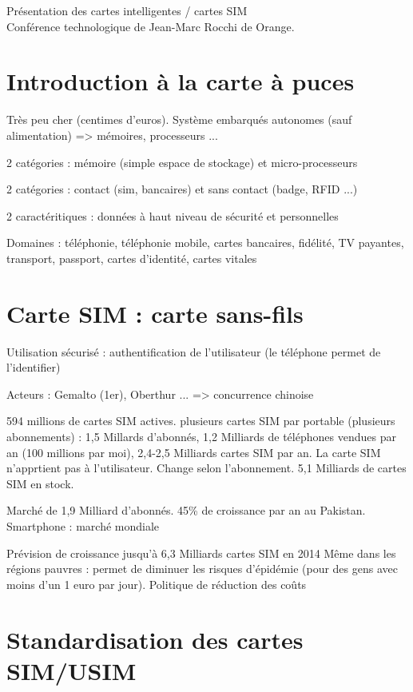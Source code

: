 \documentclass[a4paper,12pt]{article}
\begin{document}
\begin{center}
\Large{Présentation des cartes intelligentes / cartes SIM}\\
\vspace{0.4cm}
\normalsize{Conférence technologique de Jean-Marc Rocchi de Orange.}\\
\end{center}

\section{Introduction à la carte à puces}

Très peu cher (centimes d'euros).
Système embarqués autonomes (sauf alimentation) => mémoires, processeurs ...

2 catégories : mémoire (simple espace de stockage) et micro-processeurs

2 catégories : contact (sim, bancaires) et sans contact (badge, RFID ...)

2 caractéritiques : données à haut niveau de sécurité et personnelles

Domaines : téléphonie, téléphonie mobile, cartes bancaires, fidélité, TV payantes, transport, passport, cartes d'identité, cartes vitales

\section{Carte SIM : carte sans-fils}

Utilisation sécurisé : authentification de l'utilisateur (le téléphone permet de l'identifier)

Acteurs : Gemalto (1er), Oberthur ... => concurrence chinoise 

594 millions de cartes SIM actives. plusieurs cartes SIM par portable (plusieurs abonnements) : 1,5 Millards d'abonnés, 1,2 Milliards de téléphones vendues par an (100 millions par moi), 2,4-2,5 Milliards cartes SIM par an.
La carte SIM n'apprtient pas à l'utilisateur.
Change selon l'abonnement. 5,1 Milliards de cartes SIM en stock.

Marché de 1,9 Milliard d'abonnés. 45\% de croissance par an au Pakistan.
Smartphone : marché mondiale

Prévision de croissance jusqu'à 6,3 Milliards cartes SIM en 2014
Même dans les régions pauvres : permet de diminuer les risques d'épidémie (pour des gens avec moins d'un 1 euro par jour).
Politique de réduction des coûts

\section{Standardisation des cartes SIM/USIM}
\end{document}

